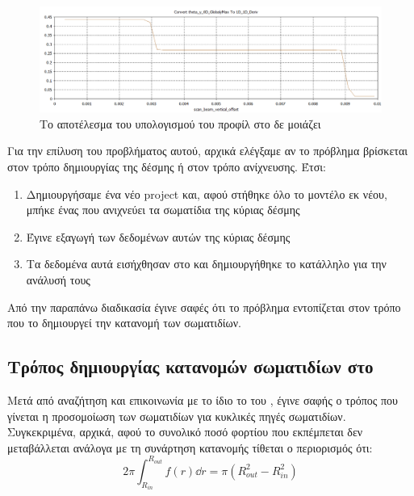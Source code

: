 \begin{figure}[tph]
\includegraphics[width=\textwidth]{figures/CST-profile-steps}
\centering
\caption{Το αποτέλεσμα του υπολογισμού του προφίλ στο  δε μοιάζει }
\label{fig:CST-profile-steps}
\end{figure}

Για την επίλυση του προβλήματος αυτού, αρχικά ελέγξαμε αν το πρόβλημα βρίσκεται στον τρόπο δημιουργίας της δέσμης ή στον τρόπο ανίχνευσης. 
Έτσι:
\begin{enumerate}
\item Δημιουργήσαμε ένα νέο project και, αφού στήθηκε όλο το μοντέλο εκ νέου, μπήκε ένας  που ανιχνεύει τα σωματίδια της κύριας δέσμης
\item Έγινε εξαγωγή των δεδομένων αυτών της κύριας δέσμης
\item Τα δεδομένα αυτά εισήχθησαν στο  και δημιουργήθηκε το κατάλληλο  για την ανάλυσή τους
\end{enumerate}

Από την παραπάνω διαδικασία έγινε σαφές ότι το πρόβλημα εντοπίζεται στον τρόπο που το  δημιουργεί την κατανομή των σωματιδίων.

\subsection{Τρόπος δημιουργίας  κατανομών σωματιδίων στο }

Μετά από αναζήτηση και επικοινωνία με το ίδιο το  του , έγινε σαφής ο τρόπος που γίνεται η προσομοίωση των σωματιδίων για  κυκλικές πηγές σωματιδίων.
Συγκεκριμένα, αρχικά, αφού το συνολικό ποσό φορτίου που εκπέμπεται δεν μεταβάλλεται ανάλογα με τη συνάρτηση κατανομής τίθεται ο περιορισμός ότι:
\begin{equation}\label{eq:CST-gaussian-restriction}
2\pi \int_{R_{in}}^{R_{out}} f(r) \dd r = \pi \left(R_{out}^2 - R_{in}^2 \right) 
\end{equation}

